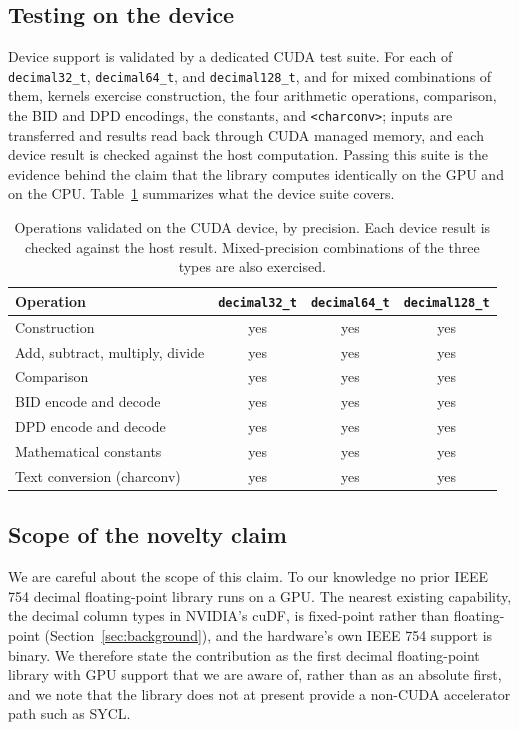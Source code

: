\documentclass[acmsmall]{acmart}
\begin{document}
\subsection{Testing on the device}
Device support is validated by a dedicated CUDA test suite. For each of
\texttt{decimal32\_t}, \texttt{decimal64\_t}, and \texttt{decimal128\_t}, and for mixed
combinations of them, kernels exercise construction, the four arithmetic operations,
comparison, the BID and DPD encodings, the constants, and \texttt{<charconv>}; inputs are
transferred and results read back through CUDA managed memory, and each device result is
checked against the host computation. Passing this suite is the evidence behind the claim
that the library computes identically on the GPU and on the CPU. Table~\ref{tab:gpu}
summarizes what the device suite covers.

\begin{table}
  \caption{Operations validated on the CUDA device, by precision. Each device result is
    checked against the host result. Mixed-precision combinations of the three types are
    also exercised.}
  \label{tab:gpu}
  \footnotesize
  \begin{tabular}{lccc}
    \toprule
    Operation & \texttt{decimal32\_t} & \texttt{decimal64\_t} & \texttt{decimal128\_t} \\
    \midrule
    Construction              & yes & yes & yes \\
    Add, subtract, multiply, divide & yes & yes & yes \\
    Comparison                & yes & yes & yes \\
    BID encode and decode     & yes & yes & yes \\
    DPD encode and decode     & yes & yes & yes \\
    Mathematical constants    & yes & yes & yes \\
    Text conversion (charconv) & yes & yes & yes \\
    \bottomrule
  \end{tabular}
\end{table}

\subsection{Scope of the novelty claim}
We are careful about the scope of this claim. To our knowledge no prior IEEE 754 decimal
floating-point library runs on a GPU. The nearest existing capability, the decimal column
types in NVIDIA's cuDF, is fixed-point rather than floating-point
(Section~\ref{sec:background}), and the hardware's own IEEE 754 support is binary. We
therefore state the contribution as the first decimal floating-point library with GPU
support that we are aware of, rather than as an absolute first, and we note that the
library does not at present provide a non-CUDA accelerator path such as SYCL.
\end{document}
